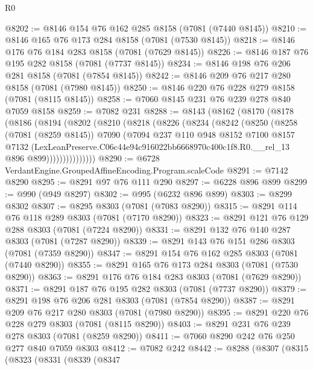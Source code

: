 \begin{lexlean}{R0}
\begin{coremodule}
@8202 := @8146 @154 @76 @162 @285 @8158 (@7081 (@7440 @8145))
@8210 := @8146 @165 @76 @173 @284 @8158 (@7081 (@7530 @8145))
@8218 := @8146 @176 @76 @184 @283 @8158 (@7081 (@7629 @8145))
@8226 := @8146 @187 @76 @195 @282 @8158 (@7081 (@7737 @8145))
@8234 := @8146 @198 @76 @206 @281 @8158 (@7081 (@7854 @8145))
@8242 := @8146 @209 @76 @217 @280 @8158 (@7081 (@7980 @8145))
@8250 := @8146 @220 @76 @228 @279 @8158 (@7081 (@8115 @8145))
@8258 := @7060 @8145 @231 @76 @239 @278 @840 @7059 @8158
@8259 := @7082 @231
@8288 := @8143
    (@8162
      (@8170
        (@8178
          (@8186
            (@8194
              (@8202
                (@8210
                  (@8218
                    (@8226
                      (@8234
                        (@8242
                          (@8250
                            (@8258
                              (@7081 (@8259 @8145))
                              @7090
                              (@7094
                                @237
                                @110
                                @948
                                @8152
                                @7100
                                @8157
                                @7132
                                (LexLeanPreserve.C06c44e94c916022bb6668970c400c1f8.R0.__rel_13
                                  @896
                                  @899)))))))))))))))
@8290 := @6728 VerdantEngine.GroupedAffineEncoding.Program.scaleCode
@8291 := @7142 @8290
@8295 := @8291 @97 @76 @111 @290
@8297 := @6228 @896 @899
@8299 := @990 (@949 @8297)
@8302 := @995 (@6232 @896 @899)
@8303 := @8299 @8302
@8307 := @8295 @8303 (@7081 (@7083 @8290))
@8315 := @8291 @114 @76 @118 @289 @8303 (@7081 (@7170 @8290))
@8323 := @8291 @121 @76 @129 @288 @8303 (@7081 (@7224 @8290))
@8331 := @8291 @132 @76 @140 @287 @8303 (@7081 (@7287 @8290))
@8339 := @8291 @143 @76 @151 @286 @8303 (@7081 (@7359 @8290))
@8347 := @8291 @154 @76 @162 @285 @8303 (@7081 (@7440 @8290))
@8355 := @8291 @165 @76 @173 @284 @8303 (@7081 (@7530 @8290))
@8363 := @8291 @176 @76 @184 @283 @8303 (@7081 (@7629 @8290))
@8371 := @8291 @187 @76 @195 @282 @8303 (@7081 (@7737 @8290))
@8379 := @8291 @198 @76 @206 @281 @8303 (@7081 (@7854 @8290))
@8387 := @8291 @209 @76 @217 @280 @8303 (@7081 (@7980 @8290))
@8395 := @8291 @220 @76 @228 @279 @8303 (@7081 (@8115 @8290))
@8403 := @8291 @231 @76 @239 @278 @8303 (@7081 (@8259 @8290))
@8411 := @7060 @8290 @242 @76 @250 @277 @840 @7059 @8303
@8412 := @7082 @242
@8442 := @8288
    (@8307
      (@8315
        (@8323
          (@8331
            (@8339
              (@8347

\end{coremodule}
\end{lexlean}
